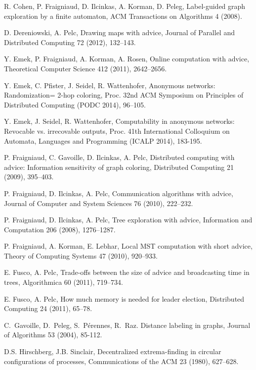 \documentclass{article}
\begin{document}
\begin{thebibliography}{99}
R. Cohen, P. Fraigniaud, D. Ilcinkas, A. Korman, D. Peleg, 
Label-guided graph exploration by a finite automaton, 
ACM Transactions on Algorithms 4 (2008).


D. Dereniowski, A. Pelc, Drawing maps with advice,  Journal of Parallel and Distributed Computing 72 (2012), 132--143. 



Y. Emek, P. Fraigniaud, A. Korman, A. Rosen, Online computation with advice, Theoretical Computer Science 412 (2011), 2642--2656.

Y. Emek, C. Pfister, J. Seidel, R. Wattenhofer, Anonymous networks: Randomization= 2-hop coloring,
Proc. 32nd ACM Symposium on Principles of Distributed Computing (PODC 2014), 96--105.

Y. Emek, J. Seidel, R. Wattenhofer, Computability in anonymous networks: Revocable vs. irrecovable outputs,
Proc. 41th International Colloquium on Automata, Languages and Programming (ICALP 2014), 183-195.


P. Fraigniaud, C. Gavoille, D. Ilcinkas, A. Pelc, 
Distributed computing with advice: Information sensitivity of graph coloring, 
Distributed Computing 21 (2009), 395--403.

P. Fraigniaud, D. Ilcinkas, A. Pelc, 
Communication algorithms with advice, Journal of  Computer and System Sciences 76 (2010), 222--232.


P. Fraigniaud, D. Ilcinkas, A. Pelc, 
Tree exploration with advice, Information and Computation 206 (2008), 1276--1287.


P. Fraigniaud, A. Korman, E. Lebhar,
Local MST computation with short advice,
Theory of Computing Systems 47 (2010), 920--933.


E. Fusco, A. Pelc, Trade-offs between the size of advice and broadcasting time in trees, Algorithmica 60 (2011), 719--734. 

E. Fusco, A. Pelc, How much memory is needed for leader election, Distributed Computing 24 (2011), 65--78.

C.~Gavoille, D.~Peleg, S.~P\'{e}rennes, R.~Raz.
Distance labeling in graphs, 
Journal of Algorithms 53 (2004), 85-112.


D.S. Hirschberg, J.B. Sinclair,
Decentralized extrema-finding in circular configurations of processes,
 Communications of the ACM 23 (1980), 627--628.



\end{thebibliography}
\end{document}
